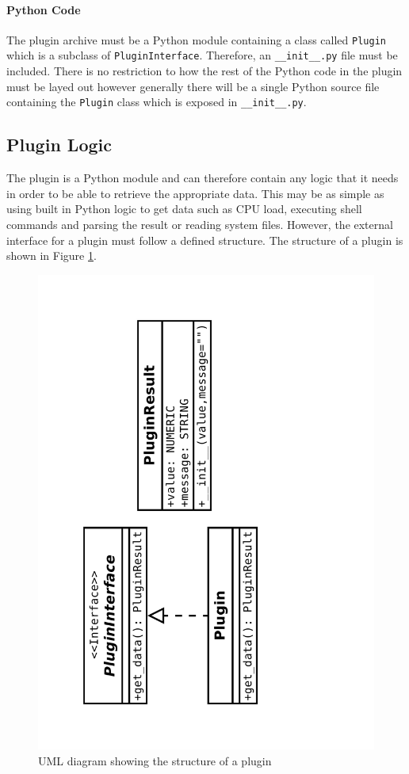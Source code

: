 \documentclass[bsc,deptreport,twoside,parskip,singlespacing,notimes]{infthesis}
\begin{document}
\paragraph*{Python Code}
	The plugin archive must be a Python module containing a class called
	\texttt{Plugin} which is a subclass of \texttt{PluginInterface}.  Therefore, an
	\texttt{\_\_init\_\_.py} file must be included.  There is no restriction to how
	the rest of the Python code in the plugin must be layed out however generally
	there will be a single Python source file containing the \texttt{Plugin} class
	which is exposed in \texttt{\_\_init\_\_.py}.

\subsection{Plugin Logic}
	The plugin is a Python module and can therefore contain any logic that it needs
	in order to be able to retrieve the appropriate data.  This may be as simple as
	using built in Python logic to get data such as CPU load, executing shell
	commands and parsing the result or reading system files.  However, the external
	interface for a plugin must follow a defined structure.  The structure of a
	plugin is shown in Figure \ref{plugin-uml}.

\begin{figure}[H]
	\centering
	\caption{UML diagram showing the structure of a plugin}
	\label{plugin-uml}
	\includegraphics[scale=0.35,angle=-90]{assets/plugin-uml.pdf}
	\vspace{-5em}
\end{figure}
\end{document}
